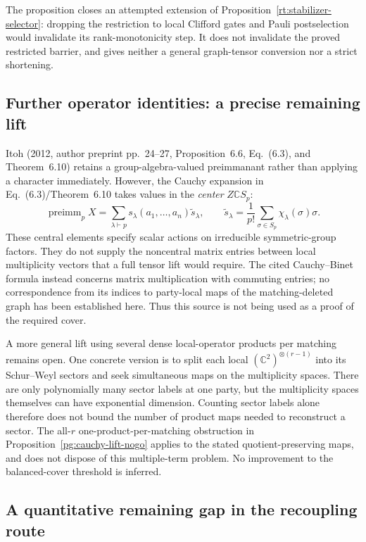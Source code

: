 The proposition closes an attempted extension of
Proposition~\ref{rt:stabilizer-selector}: dropping the restriction to
local Clifford gates and Pauli postselection would invalidate its
rank-monotonicity step. It does not invalidate the proved restricted
barrier, and gives neither a general graph-tensor conversion nor a
strict shortening.


\subsection{Further operator identities: a precise remaining lift}
\label{rt:operator-cauchy-scope}

Itoh (2012, author preprint pp.~24--27, Proposition~6.6,
Eq.~(6.3), and Theorem~6.10) retains a group-algebra-valued
preimmanant rather than applying a character immediately.
However, the Cauchy expansion in Eq.~(6.3)/Theorem~6.10 takes
values in the \emph{center} $Z\mathbb C S_p$:
\[
 \operatorname{preimm}_p X
 =\sum_{\lambda\vdash p}s_\lambda(a_1,\ldots,a_n)
                       \widetilde s_\lambda,
 \qquad
 \widetilde s_\lambda=\frac1{p!}
       \sum_{\sigma\in S_p}\chi_\lambda(\sigma)\sigma.
\]
These central elements specify scalar actions on irreducible
symmetric-group factors. They do not supply the noncentral matrix
entries between local multiplicity vectors that a full tensor lift
would require. The cited Cauchy--Binet formula instead concerns
matrix multiplication with commuting entries; no correspondence
from its indices to party-local maps of the matching-deleted graph
has been established here. Thus this source is not being used as
a proof of the required cover.

A more general lift using several dense local-operator products
per matching remains open. One concrete version is to split each
local $(\mathbb C^2)^{\otimes(r-1)}$ into its Schur--Weyl sectors
and seek simultaneous maps on the multiplicity spaces. There are
only polynomially many sector labels at one party, but the
multiplicity spaces themselves can have exponential dimension.
Counting sector labels alone therefore does not bound the number
of product maps needed to reconstruct a sector. The all-$r$
one-product-per-matching obstruction in
Proposition~\ref{pg:cauchy-lift-nogo} applies to the stated
quotient-preserving maps, and does not dispose of this multiple-term
problem. No improvement to the balanced-cover threshold is inferred.

\subsection{A quantitative remaining gap in the recoupling route}

